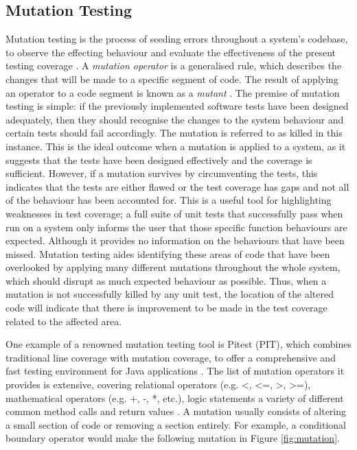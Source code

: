 \documentclass[a4paper,12pt]{article}
\begin{document}
\subsection{Mutation Testing} \label{section:Mutation Testing}
Mutation testing is the process of seeding errors throughout a system’s codebase, to observe the effecting behaviour and evaluate the effectiveness of the present testing coverage \citep{adrion81}. A \textit{mutation operator} is a generalised rule, which describes the changes that will be made to a specific segment of code. The result of applying an operator to a code segment is known as a \textit{mutant} \citep{ammann17}. The premise of mutation testing is simple: if the previously implemented software tests have been designed adequately, then they should recognise the changes to the system behaviour and certain tests should fail accordingly. The mutation is referred to as killed in this instance. This is the ideal outcome when a mutation is applied to a system, as it suggests that the tests have been designed effectively and the coverage is sufficient. However, if a mutation survives by circumventing the tests, this indicates that the tests are either flawed or the test coverage has gaps and not all of the behaviour has been accounted for. This is a useful tool for highlighting weaknesses in test coverage; a full suite of unit tests that successfully pass when run on a system only informs the user that those specific function behaviours are expected. Although it provides no information on the behaviours that have been missed. Mutation testing aides identifying these areas of code that have been overlooked by applying many different mutations throughout the whole system, which should disrupt as much expected behaviour as possible. Thus, when a mutation is not successfully killed by any unit test, the location of the altered code will indicate that there is improvement to be made in the test coverage related to the affected area.

One example of a renowned mutation testing tool is Pitest (PIT), which combines traditional line coverage with mutation coverage, to offer a comprehensive and fast testing environment for Java applications \citep{pit19}. The list of mutation operators it provides is extensive, covering relational operators (e.g. \textless, \textless=, \textgreater, \textgreater=), mathematical operators (e.g. +, -, *, etc.), logic statements a variety of different common method calls and return values \citep{pit19}. A mutation usually consists of altering a small section of code or removing a section entirely. For example, a conditional boundary operator would make the following mutation  in Figure \ref{fig:mutation}. 
\end{document}
